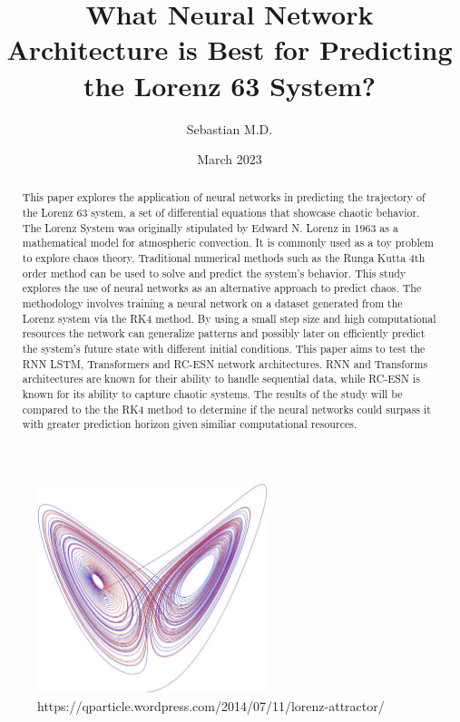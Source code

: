 \documentclass[11pt]{article}
\title{What Neural Network Architecture is Best for Predicting the Lorenz 63 System?}
\author{Sebastian M.D.}
\date{March 2023}
\begin{document}
\maketitle

\begin{abstract}
\noindent This paper explores the application of neural networks in predicting the trajectory of the Lorenz 63 system, a set of differential equations that showcase chaotic behavior. The Lorenz System was originally stipulated by Edward N. Lorenz in 1963 as a mathematical model for atmospheric convection. It is commonly used as a toy problem to explore chaos theory. Traditional numerical methods such as the Runga Kutta 4th order method can be used to solve and predict the system's behavior. This study explores the use of neural networks as an alternative approach to predict chaos. The methodology involves training a neural network on a dataset generated from the Lorenz system via the RK4 method. By using a small step size and high computational resources the network can generalize patterns and possibly later on efficiently predict the system's future state with different initial conditions. This paper aims to test the RNN LSTM, Transformers and RC-ESN network architectures. RNN and Transforms architectures are known for their ability to handle sequential data, while RC-ESN is known for its ability to capture chaotic systems. The results of the study will be compared to the the RK4 method to determine if the neural networks could surpass it with greater prediction horizon given similiar computational resources.

\end{abstract}
\begin{figure}[h]
\centering
\includegraphics[width=0.6\textwidth]{lorenz_test.jpeg}
\caption{https://qparticle.wordpress.com/2014/07/11/lorenz-attractor/}
\end{figure}
\newpage
\tableofcontents
\newpage
\end{document}
